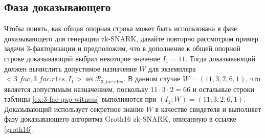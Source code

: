 \subsection{Фаза доказывающего} Чтобы понять, как общая опорная строка может быть использована в фазе доказывающего для генерации zk-SNARK, давайте повторно рассмотрим пример задачи 3-факторизации и предположим, что в дополнение к общей опорной строке доказывающий выбрал некоторое значение $I_1=11$. Тогда доказывающий должен вычислить допустимое назначение $W$ для экземпляра $<3\_fac,3\_fac.r1cs, I_1>$ из $\mathcal{R}_{3\_fac.r1cs}$. В данном случае $W=(11,3,2,6,1)$, что является допустимым назначением, поскольку $11\cdot 3\cdot 2=66$ и остальные строки таблицы \ref{ex:3-fac-qap-witness} выполняются при $(I_1;W) = (11;3,2,6,1)$. Доказывающий использует секретное знание $W$ в качестве свидетеля и выполняет фазу доказывающего алгоритма Groth16 zk-SNARK, описанную в ссылке \ref{groth16}. 

